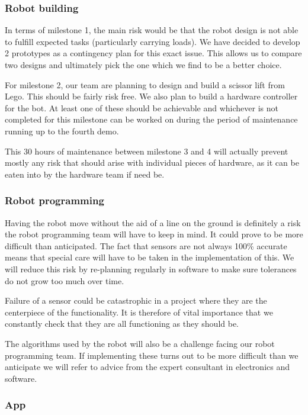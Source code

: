 \documentclass{article}
\begin{document}
\subsubsection{Robot building}

In terms of milestone 1, the main risk would be that the robot design is not able to fulfill expected tasks (particularly carrying loads). We have decided to develop 2 prototypes as a contingency plan for this exact issue. This allows us to compare two designs and ultimately pick the one which we find to be a better choice.

For milestone 2, our team are planning to design and build a scissor lift from Lego. This should be fairly risk free. We also plan to build a hardware controller for the bot. At least one of these should be achievable and whichever is not completed for this milestone can be worked on during the period of maintenance running up to the fourth demo.

This 30 hours of maintenance between milestone 3 and 4 will actually prevent mostly any risk that should arise with individual pieces of hardware, as it can be eaten into by the hardware team if need be.

\subsubsection{Robot programming}

Having the robot move without the aid of a line on the ground is definitely a risk the robot programming team will have to keep in mind. It could prove to be more difficult than anticipated. The fact that sensors are not always 100\% accurate means that special care will have to be taken in the implementation of this. We will reduce this risk by re-planning regularly in software to make sure tolerances do not grow too much over time. 

Failure of a sensor could be catastrophic in a project where they are the centerpiece of the functionality. It is therefore of vital importance that we constantly check that they are all functioning as they should be.

The algorithms used by the robot will also be a challenge facing our robot programming team. If implementing these turns out to be more difficult than we anticipate we will refer to advice from the expert consultant in electronics and software.

\subsubsection{App}
\end{document}

